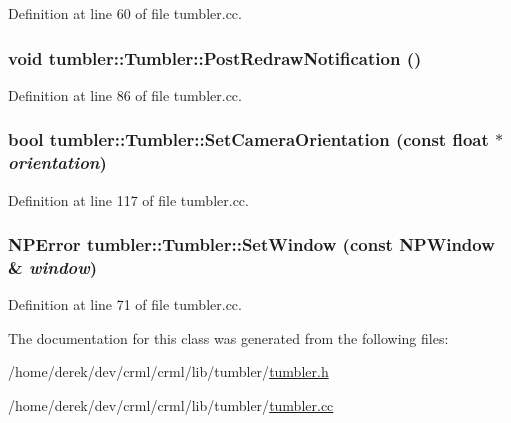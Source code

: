 Definition at line 60 of file tumbler.cc.

\hypertarget{classtumbler_1_1_tumbler_ab721f5f95ce020ce6680033771ed4577}{
\subsubsection[{PostRedrawNotification}]{\setlength{\rightskip}{0pt plus 5cm}void tumbler::Tumbler::PostRedrawNotification ()}}
\label{classtumbler_1_1_tumbler_ab721f5f95ce020ce6680033771ed4577}


Definition at line 86 of file tumbler.cc.

\hypertarget{classtumbler_1_1_tumbler_a2657d32f15492fc56406d1750172ca8c}{
\subsubsection[{SetCameraOrientation}]{\setlength{\rightskip}{0pt plus 5cm}bool tumbler::Tumbler::SetCameraOrientation (const float $\ast$ {\em orientation})}}
\label{classtumbler_1_1_tumbler_a2657d32f15492fc56406d1750172ca8c}


Definition at line 117 of file tumbler.cc.

\hypertarget{classtumbler_1_1_tumbler_a6aba2f3cfa10be35c0a789924343b1b0}{
\subsubsection[{SetWindow}]{\setlength{\rightskip}{0pt plus 5cm}NPError tumbler::Tumbler::SetWindow (const NPWindow \& {\em window})}}
\label{classtumbler_1_1_tumbler_a6aba2f3cfa10be35c0a789924343b1b0}


Definition at line 71 of file tumbler.cc.



The documentation for this class was generated from the following files:\begin{DoxyCompactItemize}
\item 
/home/derek/dev/crml/crml/lib/tumbler/\hyperlink{tumbler_8h}{tumbler.h}\item 
/home/derek/dev/crml/crml/lib/tumbler/\hyperlink{tumbler_8cc}{tumbler.cc}\end{DoxyCompactItemize}
